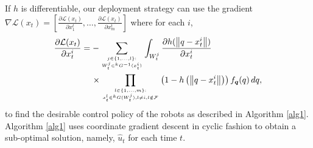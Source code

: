 \documentclass[letterpaper, 10 pt, conference]{ieeeconf}
\DeclareMathOperator*{\argmin}{arg\,min}
\begin{document}
If $h$ is differentiable, our deployment strategy can use the gradient $\nabla  \mathcal{L}(x_t)=\left[\frac{\partial\mathcal{L}(x_t)}{\partial x_1^t},\dots,\frac{\partial\mathcal{L}(x_t)}{\partial x_m^t}\right]$ where for each $i$,
\begin{align*}
\frac{\partial\mathcal{L}(x_t)}{\partial x_t^i} 
&= -\sum_{j \in \lbrace 1,\dots,l \rbrace: \atop W_t^j \in {}^kG^{-1}(x_t^i)} \int_{W_t^j}
\frac{\partial h(\left\| q-x_t^i \right\|)}{\partial x_t^i} \\
&\,\,\,\,\,\,\, \times \prod_{l \in \lbrace 1,\dots,m \rbrace: \atop x_{t}^l \in {}^kG(W_t^j),l\neq i, l \notin \mathcal{F}} \left(1- h \left(\left\|
q - x_t^i \right\|  \right) \right){f}_{\bm{q}}(q)\,dq,
\end{align*}
to find the desirable control policy of the robots as described in Algorithm \ref{alg1}. Algorithm \ref{alg1} uses coordinate gradient descent in cyclic fashion to obtain a sub-optimal solution, namely, $\hat{u}_t$ for each time $t$.
\end{document}
